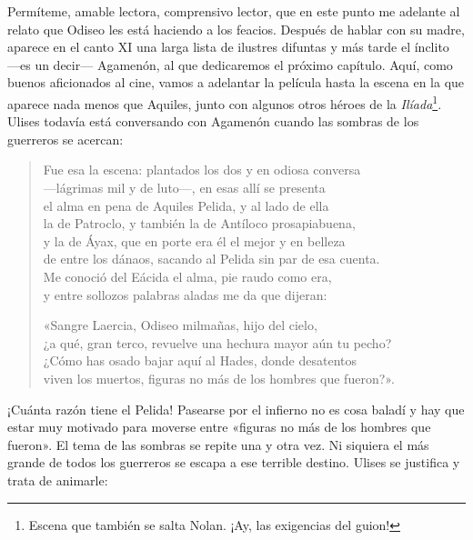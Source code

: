 \documentclass[11pt,a4paper]{article}
\begin{document}
Permíteme, amable lectora, comprensivo lector, que en este punto me adelante al relato que Odiseo les está haciendo a los feacios. Después de hablar con su madre, aparece en el canto XI una larga lista de ilustres difuntas y más tarde el ínclito ---es un decir--- Agamenón, al que dedicaremos el próximo capítulo. Aquí, como buenos aficionados al cine, vamos a adelantar la película hasta la escena en la que aparece nada menos que Aquiles, junto con algunos otros héroes de la \emph{Ilíada}\footnote{Escena que también se salta Nolan. ¡Ay, las exigencias del guion!}. Ulises todavía está conversando con Agamenón cuando las sombras de los guerreros se acercan:

\begin{verse}
Fue esa la escena: plantados los dos y en odiosa conversa\\
---lágrimas mil y de luto---, en esas allí se presenta\\
el alma en pena de Aquiles Pelida, y al lado de ella\\
la de Patroclo, y también la de Antíloco prosapiabuena,\\
y la de Áyax, que en porte era él el mejor y en belleza\\
de entre los dánaos, sacando al Pelida sin par de esa cuenta.\\
Me conoció del Eácida el alma, pie raudo como era,\\
y entre sollozos palabras aladas me da que dijeran:

«Sangre Laercia, Odiseo milmañas, hijo del cielo,\\
¿a qué, gran terco, revuelve una hechura mayor aún tu pecho?\\
¿Cómo has osado bajar aquí al Hades, donde desatentos\\
viven los muertos, figuras no más de los hombres que fueron?».
\end{verse}

¡Cuánta razón tiene el Pelida! Pasearse por el infierno no es cosa baladí y hay que estar muy motivado para moverse entre «figuras no más de los hombres que fueron». El tema de las sombras se repite una y otra vez. Ni siquiera el más grande de todos los guerreros se escapa a ese terrible destino. Ulises se justifica y trata de animarle:
\end{document}
